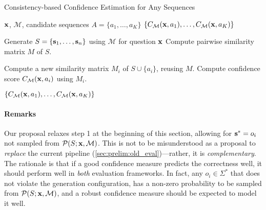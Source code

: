\begin{algorithm}[t]
\small
\caption{Consistency-based Confidence Estimation for Any Sequences}
\label{alg:confidence_score}
\begin{algorithmic}[1]
    \Require $\mathbf{x}$, $\mathcal{M}$, candidate sequences $A = \{a_1, \dots, a_K\}$
    \Ensure $\{C_{\mathcal{M}}(\mathbf{x},a_1), \dots,C_{\mathcal{M}}(\mathbf{x},a_K)\}$ 
    
    \State Generate $S = \{\mathbf{s}_1, \dots, \mathbf{s}_{n}\}$ using $\mathcal{M}$ for question $\mathbf{x}$
    \State Compute pairwise similarity matrix $M$ of $S$.%
    
        \State Compute a new similarity matrix $M_i$ of $S\cup\{a_i\}$, reusing $M$. %
        \State Compute confidence score $C_{\mathcal{M}}(\mathbf{x},a_i)$ using $M_i$. %
    \EndFor

    \State \Return $\{C_{\mathcal{M}}(\mathbf{x},a_1), \dots,C_{\mathcal{M}}(\mathbf{x},a_K)\}$ 
\end{algorithmic}
\end{algorithm}




\paragraph{Remarks}
Our proposal relaxes step 1 at the beginning of this section, allowing for $\mathbf{s}^*=o_i$ not sampled from $\mathcal{P}(S;\mathbf{x},\mathcal{M})$.
This is not to be misunderstood as a proposal to \textit{replace} the current pipeline (\cref{sec:prelim:old_eval})---rather, it is \textit{complementary}.
The rationale is that if a good confidence measure predicts the correctness well, it should perform well in \textit{both} evaluation frameworks.
In fact, any $o_i\in\Sigma^*$ that does not violate the generation configuration, has a non-zero probability to be sampled from $\mathcal{P}(S;\mathbf{x},\mathcal{M})$, and a robust confidence measure should be expected to model it well.

